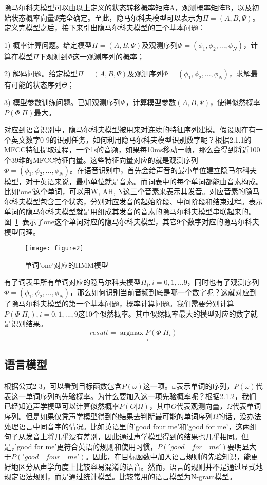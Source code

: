 隐马尔科夫模型可以由以上定义的状态转移概率矩阵A，观测概率矩阵B，以及初始状态概率向量$\Psi$完全确定。至此，隐马尔科夫模型可以表示为$\Pi=(A,B,\Psi)$。定义完模型之后，接下来引出隐马尔科夫模型的三个基本问题：

1) 概率计算问题。给定模型$\Pi=(A,B,\Psi)$及观测序列$\Phi=(\phi_1,\phi_2,...,\phi_N)$，计算在模型$\Pi$下观测到$\Phi$这一观测序列的概率；

2) 解码问题。给定模型$\Pi=(A,B,\Psi)$及观测序列$\Phi=(\phi_1,\phi_2,...,\phi_N)$，求解最有可能的状态序列$\Theta$；

3) 模型参数训练问题。已知观测序列$\Phi$，计算模型参数$(A,B,\Psi)$，使得似然概率$P(\Phi|\Pi)$最大。

对应到语音识别中，隐马尔科夫模型被用来对连续的特征序列建模。假设现在有一个英文数字0-9的识别任务，如何利用隐马尔科夫模型识别数字呢？根据2.1.1的MFCC特征提取过程，一个1s的音频，如果每10ms移动一帧，那么会得到将近100个39维的MFCC特征向量。这些特征向量对应的就是观测序列$\Phi=(\phi_1,\phi_2,...,\phi_N)$。在语音识别中，首先会给声音的最小单位建立隐马尔科夫模型，对于英语来说，最小单位就是音素。而词表中的每个单词都能由音素构成。比如‘one’这个单词，可以用W, AH, N这三个音素来表示其发音。对应音素的隐马尔科夫模型包含三个状态，分别对应发音的起始阶段、中间阶段和结束过程。表示单词的隐马尔科夫模型就是用组成其发音的音素的隐马尔科夫模型串联起来的。图~\ref{fig:figure2}~表示了one这个单词对应的隐马尔科夫模型，其它9个数字对应的隐马尔科夫模型同理。
\begin{figure}[htbp]
\centering
\texttt{[image: figure2]}
\caption{单词'one'对应的HMM模型}\label{fig:figure2}
\vspace{\baselineskip}
\end{figure}

有了词表里所有单词对应的隐马尔科夫模型$\Pi_i,i=0,1,...9$，同时也有了观测序列$\Phi=(\phi_1,\phi_2,...,\phi_N)$，那么如何识别当前音频到底是哪一个数字呢？这就对应到了隐马尔科夫模型的第一个基本问题，概率计算问题。我们需要分别计算$P(\Phi|\Pi_i), i=0,1,...,9$这10个似然概率。其中似然概率最大的模型对应的数字就是识别结果。\begin{equation}result=\underset{i}{\operatorname{argmax} P(\Phi|\Pi_i)} \end{equation}
\subsection{语言模型}
根据公式2-3，可以看到目标函数包含$P(\omega)$这一项。$\omega$表示单词的序列，$P(\omega)$代表这一单词序列的先验概率。为什么要加入这一项先验概率呢？根据2.1.2，我们已经知道声学模型可以计算似然概率$P(O|\Omega)$，其中$O$代表观测向量，$\Omega$代表单词序列。但是如果仅凭声学模型得到的结果去判断最可能的单词序列$\Omega$的话，没办法处理语言中同音字的情况。比如英语里的'good four me'和'good for me'，这两组句子从发音上将几乎没有差别，因此通过声学模型得到的结果也几乎相同。但是，'good for me'更符合英语的规则和使用习惯，$P('good\quad for\quad me')$要明显大于$P('good\quad four\quad me')$。因此，在目标函数中加入语言规则的先验知识，能更好地区分从声学角度上比较容易混淆的语音。然而，语言的规则并不是通过显式地规定语法规则，而是通过统计模型。比较常用的语言模型为N-gram模型。

